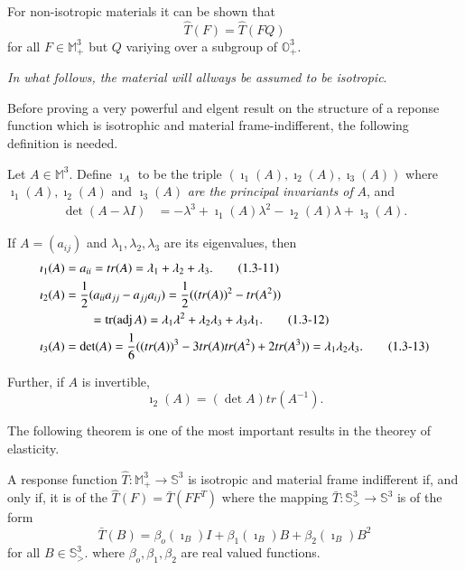 \begin{remark}\label{chap1-rem1.3.4} %
For non-isotropic materials it can be shown that 
$$
\hat{T}(F)= \hat{T}(FQ)
$$
for all $F \in \mathbb{M}^3_+$ but $Q$ variying over a subgroup of
$\mathbb{O}^3_+$.
\end{remark}

\textit{In what follows, the material will allways be assumed to be
  isotropic}. 

Before proving a very powerful and elgent result on the structure of a
reponse function which is isotrophic and material frame-indifferent,
the following definition is needed.

Let $A \in \mathbb{M}^3$. Define $\imath_A$ to be the triple $(\imath_1(A),
\imath_2(A), \imath_3(A))$ where $\imath_1(A), \imath_2(A)$ and $\imath_3(A)$ \textit{are the
  principal invariants of} $A$, and  
\begin{align*}
  \det (A- \lambda I) & =- \lambda^3 +\imath_1(A) \lambda^2 -
  \imath_2(A) \lambda + 
  \imath_3(A). \tag{1.3-10}\label{eq1.3-10}
\end{align*}

If $A =(a_{ij})$ and $\lambda_1, \lambda_2, \lambda_3$ are its
eigenvalues, then  
\begin{align*}
  \imath_1(A) & = a_{ii}= tr(A)= \lambda_1 + \lambda_2 +
  \lambda_3. \tag{1.3-11}\label{eq1.3-11}\\ 
  \imath_2(A)& = \frac{1}{2}(a_{ii}a_{jj}- a_{jj}a_{ij}) =\frac{1}{2}((
  tr(A))^2- tr(A^2))\\ 
  & \qquad = \operatorname{tr} (\operatorname{adj}  A)= \lambda_1 \lambda^2 + \lambda_2
  \lambda_3 + \lambda_3 \lambda_1. \tag{1.3-12}\label{eq1.3-12} \\
  \imath_{3}(A) & = \det (A) = \frac{1}{6}((tr(A))^3- 3tr(A) tr(A^2) +
  2tr(A^3))= \lambda_1 \lambda_2 \lambda_3. \tag{1.3-13} \label{eq1.3-13}
\end{align*}\pageoriginale

 Further, if $A$ is invertible, 
 \begin{equation*}
   \imath_2(A)= (\det A) tr(A^{-1}). \tag{1.3-14}\label{eq1.3-14}
 \end{equation*} 
 
 The following theorem is one of the most important results in the
 theorey of elasticity.
  
 \begin{theorem}\label{chap1-thm1.3.4}
    A response function $\hat{T}:
   \mathbb{M}^3_+ \to \mathbb{S}^3$ is isotropic and material frame
   indifferent if, and only if, it is of the $\hat{T}(F)= \bar{T}(FF^T)$
   where the mapping $\bar{T}: \mathbb{S}^3_> \to \mathbb{S}^3$ is of the
   form 
   \begin{equation*}
     \bar{T}(B)= \beta_o(\imath_B) I + \beta_1(\imath_B) B+\beta_2(\imath_B)B^2 \tag{1.3-15}\label{eq1.3-15}
   \end{equation*}
   for all $B \in \mathbb{S}^3_>$. where $\beta_o , \beta_1, \beta_2$ are
   real valued functions.  
 \end{theorem} 


